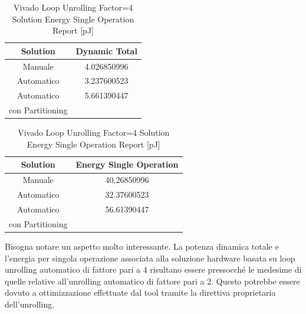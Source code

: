 \begin{table}[H]
    \centering
    \begin{minipage}[t]{0.45\linewidth}
        \centering
        \begin{tabular}{|c|c|}
            \hline
            \textbf{Solution} & \textbf{Dynamic Total} \\
            \hline
            Manuale & 4.026850996 \\
            \hline
            Automatico & 3.237600523 \\
            \hline
            Automatico & 5.661390447 \\
            con Partitioning & \\
            \hline
        \end{tabular}
        \caption{Vivado Loop Unrolling Factor=4 Solution Dynamic Power Report [mW]}
        \label{tab:vivado-loop-unrolling-factor4-solution-dynamic-power-reproot}
    \end{minipage}
    \hfill
    \centering
    \begin{minipage}[t]{0.45\linewidth}
        \centering
        \begin{tabular}{|c|c|}
            \hline
            \textbf{Solution} & \textbf{Energy Single Operation} \\
            \hline
            Manuale & 40.26850996 \\
            \hline
            Automatico & 32.37600523 \\
            \hline
            Automatico & 56.61390447 \\
            con Partitioning & \\
            \hline
        \end{tabular}
        \caption{Vivado Loop Unrolling Factor=4 Solution Energy Single Operation Report [pJ]}
        \label{tab:vivado-loop-unrolling-factor4-solution-solution-energy-single-operation-reproot}
    \end{minipage}
\end{table}

Bisogna notare un aspetto molto interessante. La potenza dinamica totale e l'energia per singola operazione associata alla soluzione hardware basata su loop unrolling automatico di fattore pari a 4 risultano essere pressocché le medesime di quelle relative all'unrolling automatico di fattore pari a 2. Questo potrebbe essere dovuto a ottimizzazione effettuate dal tool tramite la direttiva proprietaria dell'unrolling.


